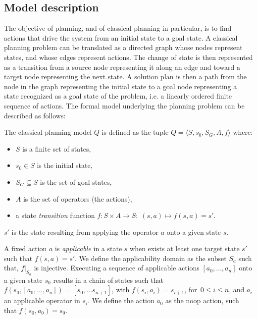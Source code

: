 \subsection{Model description}
The objective of planning, and of classical planning in particular, is
to find actions that drive the system from an initial state to a goal state.
%
A classical planning problem can be translated as a directed graph whose
nodes represent states, and whose edges represent actions.  The change
of state is then represented as a transition from a source node
representing it along an edge and toward a target node representing
the next state.  A solution plan is then a path from the node in the
graph representing the initial state to a goal node representing a
state recognized as a goal state of the problem, i.e. a linearly ordered finite sequence of actions. The formal model
underlying the planning problem can be described as follows:

\begin{definition}\label{def:classical}
 The classical planning model $Q$ is defined as the tuple 
 $Q = \langle S, s_0, S_G, A, f\rangle$ where:
  \begin{itemize}
  \item $S$ is a finite set of states,
  \item $s_0 \in S$ is the initial state,
  \item $S_G \subseteq S$ is the set of goal states,
  \item $A$ is the set of operators (the actions),
  \item a state \emph{transition} function $f: S \times A \to S : \; (s,a) \mapsto f(s,a) = s'$.
  \end{itemize}
 $s'$ is the state resulting from applying the operator $a$ onto a given state $s$.

A fixed action $a$ is \emph{applicable} in a state $s$ when exists at least one target state $s'$ such that $f(s,a)=s'$. We define the applicability domain as the subset $S_a$ such that, $f\vert_{S_a}$ is injective.
Executing a sequence of applicable actions $[ a_0, \ldots, a_n]$ onto a given state $s_0$ results in a chain of states
such that
$f\left(s_0, \left[a_0, \ldots, a_n \right]\right) = \left[ s_0, \ldots s_{n+1}  \right]$,
with $f (s_i, a_i)= s_{i+1}$, for $\,0 \le i \le n$, and $a_i$ an applicable operator in $s_i$. 
We define the action $a_0$ as the noop action, such that $f(s_0, a_0) = s_0$.
\end{definition}

